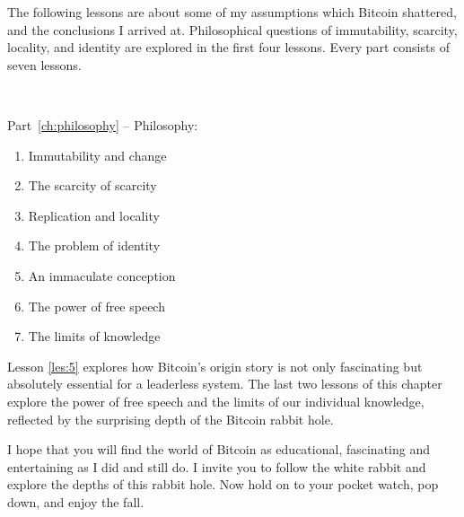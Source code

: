 The following lessons are about some of my assumptions which Bitcoin shattered,
and the conclusions I arrived at. Philosophical questions of immutability,
scarcity, locality, and identity are explored in the first four lessons.  Every
part consists of seven lessons.

~

\begin{samepage}
Part~\ref{ch:philosophy} -- Philosophy:

\begin{enumerate}
  \item Immutability and change
  \item The scarcity of scarcity
  \item Replication and locality
  \item The problem of identity
  \item An immaculate conception
  \item The power of free speech
  \item The limits of knowledge
\end{enumerate}
\end{samepage}

Lesson \ref{les:5} explores how Bitcoin's origin story is not only fascinating but
absolutely essential for a leaderless system. The last two lessons of this
chapter explore the power of free speech and the limits of our individual
knowledge, reflected by the surprising depth of the Bitcoin rabbit hole.

I hope that you will find the world of Bitcoin as educational, fascinating and
entertaining as I did and still do. I invite you to follow the white rabbit and
explore the depths of this rabbit hole. Now hold on to your pocket watch, pop
down, and enjoy the fall.
